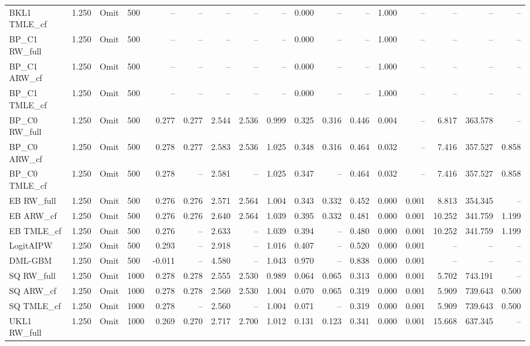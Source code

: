 \begin{tabular}{llllrrrrrrrrrrrrr}
BKL1 TMLE\_cf & 1.250 & Omit & 500 & -- & -- & -- & -- & -- & 0.000 & -- & -- & 1.000 & -- & -- & -- & -- \\
BP\_C1 RW\_full & 1.250 & Omit & 500 & -- & -- & -- & -- & -- & 0.000 & -- & -- & 1.000 & -- & -- & -- & -- \\
BP\_C1 ARW\_cf & 1.250 & Omit & 500 & -- & -- & -- & -- & -- & 0.000 & -- & -- & 1.000 & -- & -- & -- & -- \\
BP\_C1 TMLE\_cf & 1.250 & Omit & 500 & -- & -- & -- & -- & -- & 0.000 & -- & -- & 1.000 & -- & -- & -- & -- \\
BP\_C0 RW\_full & 1.250 & Omit & 500 & 0.277 & 0.277 & 2.544 & 2.536 & 0.999 & 0.325 & 0.316 & 0.446 & 0.004 & -- & 6.817 & 363.578 & -- \\
BP\_C0 ARW\_cf & 1.250 & Omit & 500 & 0.278 & 0.277 & 2.583 & 2.536 & 1.025 & 0.348 & 0.316 & 0.464 & 0.032 & -- & 7.416 & 357.527 & 0.858 \\
BP\_C0 TMLE\_cf & 1.250 & Omit & 500 & 0.278 & -- & 2.581 & -- & 1.025 & 0.347 & -- & 0.464 & 0.032 & -- & 7.416 & 357.527 & 0.858 \\
EB RW\_full & 1.250 & Omit & 500 & 0.276 & 0.276 & 2.571 & 2.564 & 1.004 & 0.343 & 0.332 & 0.452 & 0.000 & 0.001 & 8.813 & 354.345 & -- \\
EB ARW\_cf & 1.250 & Omit & 500 & 0.276 & 0.276 & 2.640 & 2.564 & 1.039 & 0.395 & 0.332 & 0.481 & 0.000 & 0.001 & 10.252 & 341.759 & 1.199 \\
EB TMLE\_cf & 1.250 & Omit & 500 & 0.276 & -- & 2.633 & -- & 1.039 & 0.394 & -- & 0.480 & 0.000 & 0.001 & 10.252 & 341.759 & 1.199 \\
LogitAIPW & 1.250 & Omit & 500 & 0.293 & -- & 2.918 & -- & 1.016 & 0.407 & -- & 0.520 & 0.000 & 0.001 & -- & -- & -- \\
DML-GBM & 1.250 & Omit & 500 & -0.011 & -- & 4.580 & -- & 1.043 & 0.970 & -- & 0.838 & 0.000 & 0.001 & -- & -- & -- \\
SQ RW\_full & 1.250 & Omit & 1000 & 0.278 & 0.278 & 2.555 & 2.530 & 0.989 & 0.064 & 0.065 & 0.313 & 0.000 & 0.001 & 5.702 & 743.191 & -- \\
SQ ARW\_cf & 1.250 & Omit & 1000 & 0.278 & 0.278 & 2.560 & 2.530 & 1.004 & 0.070 & 0.065 & 0.319 & 0.000 & 0.001 & 5.909 & 739.643 & 0.500 \\
SQ TMLE\_cf & 1.250 & Omit & 1000 & 0.278 & -- & 2.560 & -- & 1.004 & 0.071 & -- & 0.319 & 0.000 & 0.001 & 5.909 & 739.643 & 0.500 \\
UKL1 RW\_full & 1.250 & Omit & 1000 & 0.269 & 0.270 & 2.717 & 2.700 & 1.012 & 0.131 & 0.123 & 0.341 & 0.000 & 0.001 & 15.668 & 637.345 & -- \\

\end{tabular}

